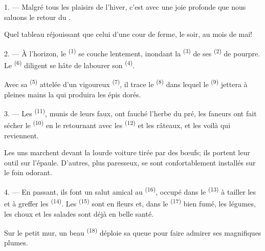\VUsaut{3.0mm}
\VUsaut{3.0mm}

\VUsaut{4.0mm}

1. --- Malgré tous les plaisirs de l'hiver, c'est avec une joie profonde que
nous saluons le retour du .

Quel tableau réjouissant que celui d'une cour de ferme, le soir, au mois de mai!

2. --- À l'horizon, le  \textsuperscript{(1)} se couche
lentement, inondant la  \textsuperscript{(3)} de ses
 \textsuperscript{(2)} de pourpre. Le 
\textsuperscript{(6)} diligent se hâte de labourer son 
\textsuperscript{(4)}.

Avec sa  \textsuperscript{(5)} attelée d'un vigoureux
 \textsuperscript{(7)}, il trace le 
\textsuperscript{(8)} dans lequel le  \textsuperscript{(9)}
jettera à pleines mains la  qui produira les épis dorés.

3. --- Les  \textsuperscript{(11)}, munis de leurs faux, ont
fauché l'herbe du pré, les faneurs ont fait sécher le 
\textsuperscript{(10)} en le retournant avec les 
\textsuperscript{(12)} et les râteaux, et les voilà qui reviennent.

Les uns marchent devant la lourde voiture tirée par des bœufs; ils portent leur
outil sur l'épaule. D'autres, plus paresseux, se sont confortablement installés
sur le foin odorant.

4. --- En passant, ils font un salut amical au 
\textsuperscript{(16)}, occupé dans le  \textsuperscript{(13)} à
tailler les  et à greffer les 
\textsuperscript{(14)}. Les  \textsuperscript{(15)} sont en
fleurs et, dans le  \textsuperscript{(17)} bien fumé, les
légumes, les choux et les salades sont déjà en belle santé.

Sur le petit mur, un beau  \textsuperscript{(18)} déploie sa queue
pour faire admirer ses magnifiques plumes.

\VUsaut{3.0mm}

